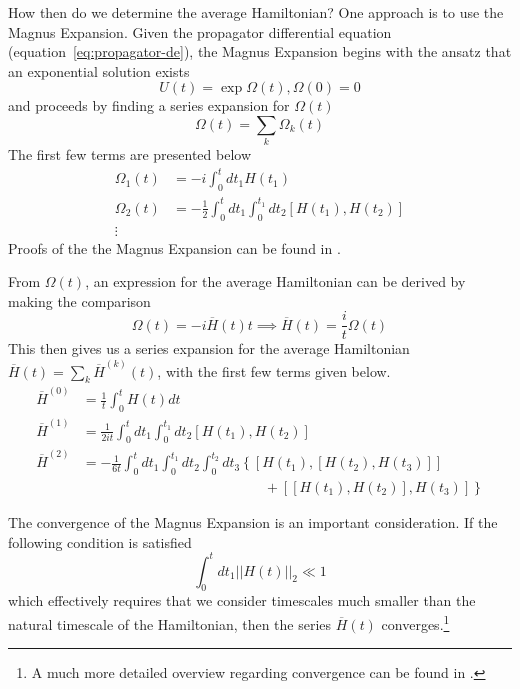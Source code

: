How then do we determine the average Hamiltonian? One approach is to use the Magnus Expansion.\cite{Blanes_2009,2010EJPh...31..907B} Given the propagator differential equation (equation~\ref{eq:propagator-de}), the Magnus Expansion begins with the ansatz that an exponential solution exists
\[
U(t) = \exp{\Omega(t)}, \Omega(0) = 0
\]
and proceeds by finding a series expansion for $\Omega(t)$
\[
\Omega(t) = \sum_k \Omega_k(t)
\]
The first few terms are presented below
\begin{align*}
    \Omega_1(t) &= -i \int_0^t dt_1 H(t_1) \\
    \Omega_2(t) &= -\frac{1}{2} \int_0^t dt_1 \int_0^{t_1} dt_2 [H(t_1), H(t_2)] \\
    \vdots
\end{align*}
Proofs of the the Magnus Expansion can be found in
\cite{gerstein-dybowski,Blanes_2009,2010EJPh...31..907B}.

From $\Omega(t)$, an expression for the average Hamiltonian can be derived by making the comparison
\[
\Omega(t) = -i \overline{H}(t) t \implies \overline{H}(t) = \frac{i}{t} \Omega(t)
\]
This then gives us a series expansion for the average Hamiltonian $\overline{H}(t) = \sum_k \overline{H}^{(k)}(t)$, with the first few terms given below.
\begin{align}\label{eq:AHT-terms}
    \overline{H}^{(0)} &= \frac{1}{t} \int_0^{t}
        H(t) dt \\
    \overline{H}^{(1)} &= \frac{1}{2it} \int_0^{t} dt_1 \int_0^{t_1} dt_2
        \left[H(t_1), H(t_2)\right] \\
    \overline{H}^{(2)} &= -\frac{1}{6t}
    \int_0^{t} dt_1 \int_0^{t_1} dt_2 \int_0^{t_2} dt_3
    \left\{
    \left[H(t_1), \left[H(t_2), H(t_3)\right]\right] \right. \\
    & \hspace{13em} + \left.
    \left[\left[H(t_1), H(t_2)\right], H(t_3)\right]
    \right\}
\end{align}

The convergence of the Magnus Expansion is an important consideration. If the following condition is satisfied
\begin{equation}\label{eq:AHT-convergence}
    \int_0^t dt_1 ||H(t)||_2 \ll 1
\end{equation}
which effectively requires that we consider timescales much smaller than the natural timescale of the Hamiltonian, then the series $\overline{H}(t)$ converges.\footnote{A much more detailed overview regarding convergence can be found in \cite{Blanes_2009}.}

